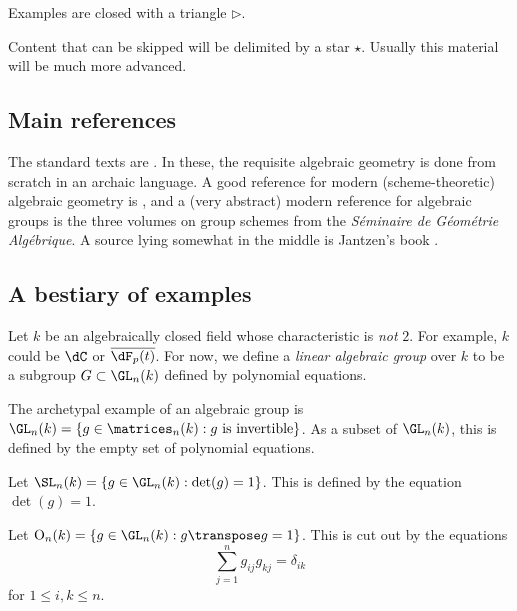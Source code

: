 Examples are closed with a triangle $\triangleright$. 

Content that can be skipped will be delimited by a star $\star$. Usually 
this material will be much more advanced. 





\subsection{Main references}

The standard texts are \cite{borel-1991,humphreys-1975,springer-2009}. In 
these, the requisite algebraic geometry is done from scratch in an archaic 
language. A good reference for modern (scheme-theoretic) algebraic geometry is 
\cite{hartshorne-1977}, and a (very abstract) modern reference for algebraic 
groups is the three volumes on group schemes \cite{sga3-i,sga3-ii,sga3-iii} 
from the \emph{S\'eminaire de G\'eom\'etrie Alg\'ebrique}. A source lying 
somewhat in the middle is Jantzen's book \cite{jantzen-2003}. 





\subsection{A bestiary of examples}

Let $k$ be an algebraically closed field whose characteristic is \emph{not} 
$2$. For example, $k$ could be $\dC$ or $\overline{\dF_p(t)}$. For now, we 
define a \emph{linear algebraic group} over $k$ to be a subgroup 
$G\subset \GL_n(k)$ defined by polynomial equations. 

\begin{example}
The archetypal example of an algebraic group is 
$\GL_n(k)=\{g\in \matrices_n(k):g\text{ is invertible}\}$. As a subset of 
$\GL_n(k)$, this is defined by the empty set of polynomial equations. 
\end{example}

\begin{example}
Let $\SL_n(k)=\{g\in \GL_n(k):\det(g)=1\}$. This is defined by the equation 
$\det(g)=1$. 
\end{example}

\begin{example}[Orthogonal]\label{eg:1st-orthogonal}
Let $\operatorname{O}_n(k)=\{g\in \GL_n(k):g \transpose g=1\}$. This is cut 
out by the equations 
\[
  \sum_{j=1}^n g_{i j} g_{k j} = \delta_{i k}
\]
for $1\leqslant i,k\leqslant n$. 
\end{example}

